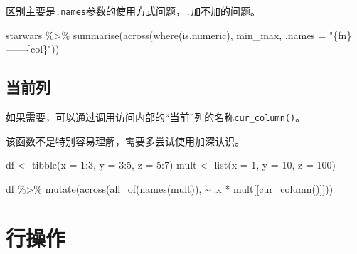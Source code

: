 \documentclass[
]{book}
\newenvironment{Shaded}{\begin{snugshade}}{\end{snugshade}}
\newcommand{\AttributeTok}[1]{\textcolor[rgb]{0.77,0.63,0.00}{#1}}
\newcommand{\DecValTok}[1]{\textcolor[rgb]{0.00,0.00,0.81}{#1}}
\newcommand{\FunctionTok}[1]{\textcolor[rgb]{0.00,0.00,0.00}{#1}}
\newcommand{\NormalTok}[1]{#1}
\newcommand{\OtherTok}[1]{\textcolor[rgb]{0.56,0.35,0.01}{#1}}
\newcommand{\SpecialCharTok}[1]{\textcolor[rgb]{0.00,0.00,0.00}{#1}}
\newcommand{\StringTok}[1]{\textcolor[rgb]{0.31,0.60,0.02}{#1}}
\begin{document}
区别主要是\texttt{.names}参数的使用方式问题，\texttt{.}加不加的问题。

\begin{Shaded}
\begin{Highlighting}[]

\NormalTok{starwars }\SpecialCharTok{\%\textgreater{}\%} \FunctionTok{summarise}\NormalTok{(}\FunctionTok{across}\NormalTok{(}\FunctionTok{where}\NormalTok{(is.numeric), min\_max, }\AttributeTok{.names =} \StringTok{"\{fn\}——\{col\}"}\NormalTok{))}
\end{Highlighting}
\end{Shaded}

\hypertarget{ux5f53ux524dux5217}{%
\subsection{当前列}\label{ux5f53ux524dux5217}}

如果需要，可以通过调用访问内部的``当前''列的名称\texttt{cur\_column()}。

该函数不是特别容易理解，需要多尝试使用加深认识。

\begin{Shaded}
\begin{Highlighting}[]
\NormalTok{df }\OtherTok{\textless{}{-}} \FunctionTok{tibble}\NormalTok{(}\AttributeTok{x =} \DecValTok{1}\SpecialCharTok{:}\DecValTok{3}\NormalTok{, }\AttributeTok{y =} \DecValTok{3}\SpecialCharTok{:}\DecValTok{5}\NormalTok{, }\AttributeTok{z =} \DecValTok{5}\SpecialCharTok{:}\DecValTok{7}\NormalTok{)}
\NormalTok{mult }\OtherTok{\textless{}{-}} \FunctionTok{list}\NormalTok{(}\AttributeTok{x =} \DecValTok{1}\NormalTok{, }\AttributeTok{y =} \DecValTok{10}\NormalTok{, }\AttributeTok{z =} \DecValTok{100}\NormalTok{)}

\NormalTok{df }\SpecialCharTok{\%\textgreater{}\%} \FunctionTok{mutate}\NormalTok{(}\FunctionTok{across}\NormalTok{(}\FunctionTok{all\_of}\NormalTok{(}\FunctionTok{names}\NormalTok{(mult)), }\SpecialCharTok{\textasciitilde{}}\NormalTok{ .x }\SpecialCharTok{*}\NormalTok{ mult[[}\FunctionTok{cur\_column}\NormalTok{()]]))}
\end{Highlighting}
\end{Shaded}

\hypertarget{dplyr-row-manipulation}{%
\section{行操作}\label{dplyr-row-manipulation}}
\end{document}
